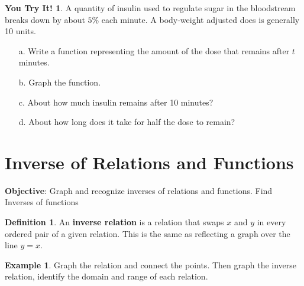 \documentclass{report}
\theoremstyle{definition}
\newtheorem{example}{\bf Example}
\newtheorem{youtry}{\bf You Try It!}
\newtheorem{definition}{\bf Definition}[section]
\begin{document}
\begin{youtry}
A quantity of insulin used to regulate sugar in the bloodstream breaks down by about $5\%$ each minute. A body-weight adjusted does is generally 10 units.
\end{youtry}
\begin{itemize}
\item[a.] Write a function representing the amount of the dose that remains after $t$ minutes.
\vspace{1.5cm}
\item[b.] Graph the function.
\vspace{1.5cm}
\item[c.] About how much insulin remains after 10 minutes?
\vspace{1.5cm}
\item[d.] About how long does it take for half the dose to remain?
\end{itemize}
\vfill

 \noindent{} \hfill 

 \newpage

 \section{Inverse of Relations and Functions }
 \indent\hfill\small\noindent \textbf{Objective}: Graph and recognize inverses of relations and functions. Find Inverses of functions\normalsize\\
 \setcounter{example}{0}
 \setcounter{definition}{0}

\vspace{-0.5cm}

\begin{definition}
An \textbf{inverse relation} is a relation that swaps $x$ and $y$ in every ordered pair of a given relation. This is the same as reflecting a graph over the line $y=x$.
\end{definition}

\begin{example}
Graph the relation and connect the points. Then graph the inverse relation, identify the domain and range of each relation.
\end{example}
\large
\end{document}
